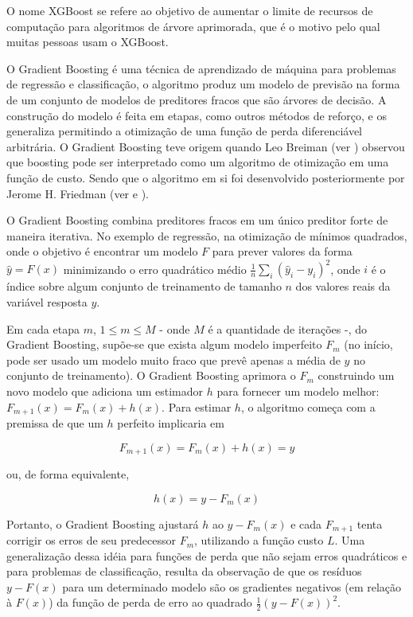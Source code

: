 O nome XGBoost se refere ao objetivo de aumentar o limite de recursos de computação para algoritmos de árvore aprimorada, que é o motivo pelo qual muitas pessoas usam o XGBoost.

O Gradient Boosting é uma técnica de aprendizado de máquina para problemas de regressão e classificação, o algoritmo produz um modelo de previsão na forma de um conjunto de modelos de preditores fracos que são árvores de decisão. A construção do modelo é feita em etapas, como outros métodos de reforço, e os generaliza permitindo a otimização de uma função de perda diferenciável arbitrária. O Gradient Boosting teve origem quando Leo Breiman (ver \citet{Breiman1997}) observou que boosting pode ser interpretado como um algoritmo de otimização em uma função de custo. Sendo que o algoritmo em si foi desenvolvido posteriormente por Jerome H. Friedman (ver \citet{Friedman199902} e \citet{Friedman199903}).

O Gradient Boosting combina preditores fracos em um único preditor forte de maneira iterativa. No exemplo de regressão, na otimização de mínimos quadrados, onde o objetivo é encontrar um modelo $ F $ para prever valores da forma $ \hat{y} = F(x) $ minimizando o erro quadrático médio $ \tfrac{1}{n} \sum_{i} ({\hat{y}}_{i}-y_{i})^{2} $, onde $ i $ é o índice sobre algum conjunto de treinamento de tamanho $ n $ dos valores reais da variável resposta $ y $.

Em cada etapa $ m $, $ 1 \leq m \leq M $ - onde $ M $ é a quantidade de iterações -, do Gradient Boosting, supõe-se que exista algum modelo imperfeito $ F_{m} $ (no início, pode ser usado um modelo muito fraco que prevê apenas a média de $ y $ no conjunto de treinamento). O Gradient Boosting aprimora o $ F_{m} $ construindo um novo modelo que adiciona um estimador $ h $ para fornecer um modelo melhor: $ F_{m + 1}(x) = F_{m}(x) + h(x) $. Para estimar $ h $, o algoritmo começa com a premissa de que um $ h $ perfeito implicaria em

\begin{equation}
F_{m + 1}(x) = F_{m}(x) + h(x) = y
\end{equation}

ou, de forma equivalente,

\begin{equation}
h(x) = y - F_{m}(x)
\end{equation}

Portanto, o Gradient Boosting ajustará $ h $ ao $ y - F_{m}(x) $ e cada $ F_{m + 1} $ tenta corrigir os erros de seu predecessor $ F_{m} $, utilizando a função custo $ L $. Uma generalização dessa idéia para funções de perda que não sejam erros quadráticos e para problemas de classificação, resulta da observação de que os resíduos $ y - F(x) $ para um determinado modelo são os gradientes negativos (em relação à $ F(x) $) da função de perda de erro ao quadrado $ \frac{1}{2} (y - F(x))^{2} $.


